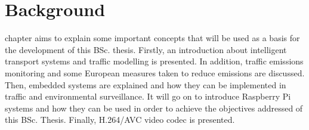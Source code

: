 
\chapter{Background}
\label{chap:background}

 chapter aims to explain some important concepts that will be used as a basis for the development of this \ac{BSc.} thesis. Firstly, an introduction about intelligent transport systems and traffic modelling is presented. In addition, traffic emissions monitoring and some European measures taken to reduce emissions are discussed. Then, embedded systems are explained and how they can be implemented in traffic and environmental surveillance. It will go on to introduce Raspberry Pi systems and how they can be used in order to achieve the objectives addressed of this \ac{BSc.} Thesis. Finally, H.264/AVC video codec is presented.

